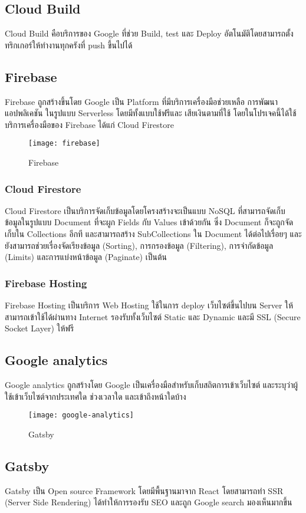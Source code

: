 \subsection{Cloud Build}
Cloud Build คือบริการของ Google ที่ช่วย Build, test และ Deploy อัตโนมัติโดยสามารถตั้งทริกเกอร์ให้ทำงานทุกครังที่ push ขึ้นไปได้
\subsection{Firebase}
Firebase ถูกสร้างขึ้นโดย Google เป็น Platform ที่มีบริการเครื่องมือช่วยเหลือ การพัฒนาแอปพลิเคชัน ในรูปแบบ Serverless โดยมีทั้งแบบใช้ฟรีและ เสียเงินตามที่ใช้ โดยในโปรเจคนี้ได้ใช้บริการเครื่องมือของ Firebase ได้แก่ Cloud Firestore
\begin{figure}[!h]
	\centering
	\texttt{[image: firebase]}
	\caption{Firebase}
	\label{Fig:firebase}
\end{figure}
\subsubsection{Cloud Firestore}
Cloud Firestore เป็นบริการจัดเก็บข้อมูลโดยโครงสร้างจะเป็นแบบ NoSQL ที่สามารถจัดเก็บข้อมูลในรูปแบบ Document ที่จะผูก Fields กับ Values เข้าด้วยกัน
ซึ่ง Document ก็จะถูกจัดเก็บใน Collections อีกที และสามารถสร้าง SubCollections ใน Document ได้ต่อไปเรื่อยๆ และยังสามารถช่วยเรื่องจัดเรียงข้อมูล (Sorting), การกรองข้อมูล (Filtering), การจำกัดข้อมูล (Limits) และการแบ่งหน้าข้อมูล (Paginate) เป็นต้น
\subsubsection{Firebase Hosting}
Firebase Hosting เป็นบริการ Web Hosting ใช้ในการ deploy เว็บไซต์ขึ้นไปบน Server ให้สามารถเข้าใช้ได้ผ่านทาง Internet รองรับทั้งเว็บไซต์ Static และ Dynamic และมี SSL (Secure Socket Layer) ให้ฟรี

\subsection{Google analytics}
Google analytics ถูกสร้างโดย Google เป็นเครื่องมือสำหรับเก็บสถิตการเข้าเว็บไซต์ และระบุว่าผู้ใช้เข้าเว็บไซต์จากประเทศใด ช่วงเวลาใด และเข้าถึงหน้าใดบ้าง
\begin{figure}[!h]
	\centering
	\texttt{[image: google-analytics]}
	\caption{Gatsby}
	\label{Fig:gatsby}
\end{figure}

\subsection{Gatsby}
Gatsby เป็น Open source Framework โดยมีพื้นฐานมาจาก React โดยสามารถทำ SSR (Server Side Rendering)
ได้ทำให้การรองรับ SEO และถูก Google search มองเห็นมากขึ้น

